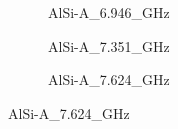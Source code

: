 \documentclass[../../main.tex]{subfiles}
\begin{document}
\begin{figure}[H]
    \begin{subfigure}{0.33\textwidth}
        \centering
        \setlength{}
        \setlength\figureheight{10em}
        
        \caption{AlSi-A\_6.946\_GHz}
    \end{subfigure}
    \begin{subfigure}{0.33\textwidth}
        \centering
        \setlength{}
        \setlength\figureheight{10em}
        
        \caption{AlSi-A\_7.351\_GHz}
    \end{subfigure}
    \begin{subfigure}{0.33\textwidth}
        \centering
        \setlength{}
        \setlength\figureheight{10em}
        
        \caption{AlSi-A\_7.624\_GHz}
    \end{subfigure}
\end{figure}
\end{document}
